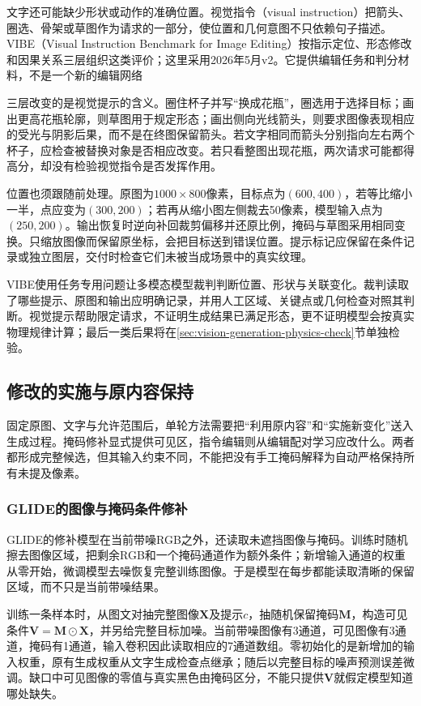 文字还可能缺少形状或动作的准确位置。视觉指令（visual instruction）把箭头、圈选、骨架或草图作为请求的一部分，使位置和几何意图不只依赖句子描述。VIBE（Visual Instruction Benchmark for Image Editing）按指示定位、形态修改和因果关系三层组织这类评价；这里采用2026年5月v2。它提供编辑任务和判分材料，不是一个新的编辑网络

三层改变的是视觉提示的含义。圈住杯子并写“换成花瓶”，圈选用于选择目标；画出更高花瓶轮廓，则草图用于规定形态；画出侧向光线箭头，则要求图像表现相应的受光与阴影后果，而不是在终图保留箭头。若文字相同而箭头分别指向左右两个杯子，应检查被替换对象是否相应改变。若只看整图出现花瓶，两次请求可能都得高分，却没有检验视觉指令是否发挥作用。

位置也须跟随前处理。原图为$1000\times800$像素，目标点为$(600,400)$，若等比缩小一半，点应变为$(300,200)$；若再从缩小图左侧裁去50像素，模型输入点为$(250,200)$。输出恢复时逆向补回裁剪偏移并还原比例，掩码与草图采用相同变换。只缩放图像而保留原坐标，会把目标送到错误位置。提示标记应保留在条件记录或独立图层，交付时检查它们未被当成场景中的真实纹理。

VIBE使用任务专用问题让多模态模型裁判判断位置、形状与关联变化。裁判读取了哪些提示、原图和输出应明确记录，并用人工区域、关键点或几何检查对照其判断。视觉提示帮助限定请求，不证明生成结果已满足形态，更不证明模型会按真实物理规律计算；最后一类后果将在\ref{sec:vision-generation-physics-check}节单独检验。

\subsection{修改的实施与原内容保持}
\label{sec:vision-generation-editing-methods}

固定原图、文字与允许范围后，单轮方法需要把“利用原内容”和“实施新变化”送入生成过程。掩码修补显式提供可见区，指令编辑则从编辑配对学习应改什么。两者都形成完整候选，但其输入约束不同，不能把没有手工掩码解释为自动严格保持所有未提及像素。

\subsubsection{GLIDE的图像与掩码条件修补}
\label{sec:vision-generation-glide-inpainting}

GLIDE的修补模型在当前带噪RGB之外，还读取未遮挡图像与掩码。训练时随机擦去图像区域，把剩余RGB和一个掩码通道作为额外条件；新增输入通道的权重从零开始，微调模型去噪恢复完整训练图像。于是模型在每步都能读取清晰的保留区域，而不只是当前带噪结果。

训练一条样本时，从图文对抽完整图像$\bm{X}$及提示$c$，抽随机保留掩码$\bm{M}$，构造可见条件$\bm{V}=\bm{M}\odot\bm{X}$，并另给完整目标加噪。当前带噪图像有3通道，可见图像有3通道，掩码有1通道，输入卷积因此读取相应的7通道数组。零初始化的是新增加的输入权重，原有生成权重从文字生成检查点继承；随后以完整目标的噪声预测误差微调。缺口中可见图像的零值与真实黑色由掩码区分，不能只提供$\bm{V}$就假定模型知道哪处缺失。

